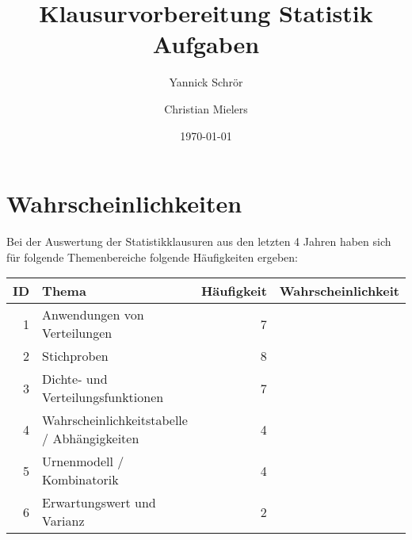 \documentclass[11pt, a4paper]{article}
\title{Klausurvorbereitung Statistik \\ Aufgaben}
\author{Yannick Schrör \and Christian Mielers}
\date{\today}
\begin{document}
\maketitle
\section{Wahrscheinlichkeiten}
Bei der Auswertung der Statistikklausuren aus den letzten 4 Jahren haben sich für folgende Themenbereiche folgende Häufigkeiten ergeben:\\

\begin{tabular}{r|l|r|r}
	ID 	&	Thema 										& Häufigkeit 	& Wahrscheinlichkeit\\ \hline
	1	& Anwendungen von Verteilungen 					& 7 			& \\
	2	& Stichproben 									& 8				& \\
	3	& Dichte- und Verteilungsfunktionen 			& 7 			& \\
	4	& Wahrscheinlichkeitstabelle / Abhängigkeiten 	& 4 			& \\
	5	& Urnenmodell / Kombinatorik 					& 4 			& \\
	6	& Erwartungswert und Varianz 					& 2 			& \\
\end{tabular}\\
\end{document}
